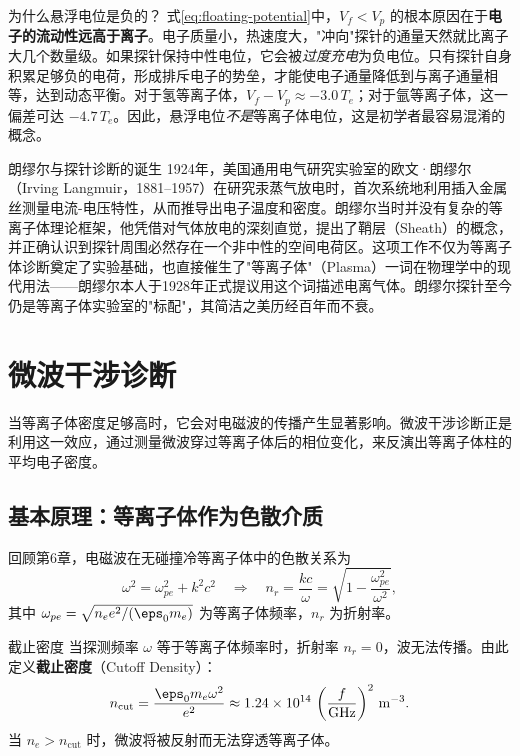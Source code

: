 \begin{insight}{为什么悬浮电位是负的？}{}{}
式\eqref{eq:floating-potential}中，$V_f < V_p$ 的根本原因在于\textbf{电子的流动性远高于离子}。电子质量小，热速度大，"冲向"探针的通量天然就比离子大几个数量级。如果探针保持中性电位，它会被\emph{过度充电}为负电位。只有探针自身积累足够负的电荷，形成排斥电子的势垒，才能使电子通量降低到与离子通量相等，达到动态平衡。对于氢等离子体，$V_f - V_p \approx -3.0\,T_e$；对于氩等离子体，这一偏差可达 $-4.7\,T_e$。因此，悬浮电位\emph{不是}等离子体电位，这是初学者最容易混淆的概念。
\end{insight}

\begin{history}{朗缪尔与探针诊断的诞生}{}{}
1924年，美国通用电气研究实验室的欧文·朗缪尔（Irving Langmuir，1881--1957）在研究汞蒸气放电时，首次系统地利用插入金属丝测量电流-电压特性，从而推导出电子温度和密度。朗缪尔当时并没有复杂的等离子体理论框架，他凭借对气体放电的深刻直觉，提出了鞘层（Sheath）的概念，并正确认识到探针周围必然存在一个非中性的空间电荷区。这项工作不仅为等离子体诊断奠定了实验基础，也直接催生了"等离子体"（Plasma）一词在物理学中的现代用法——朗缪尔本人于1928年正式提议用这个词描述电离气体。朗缪尔探针至今仍是等离子体实验室的"标配"，其简洁之美历经百年而不衰。
\end{history}


\section{微波干涉诊断}
\label{sec:12.3}

当等离子体密度足够高时，它会对电磁波的传播产生显著影响。微波干涉诊断正是利用这一效应，通过测量微波穿过等离子体后的相位变化，来反演出等离子体柱的平均电子密度。

\subsection{基本原理：等离子体作为色散介质}

回顾第6章，电磁波在无碰撞冷等离子体中的色散关系为
\begin{equation}
\omega^2 = \omega_{pe}^2 + k^2 c^2
\quad\Longrightarrow\quad
n_r = \frac{kc}{\omega} = \sqrt{1 - \frac{\omega_{pe}^2}{\omega^2}},
\label{eq:dispersion-cold}
\end{equation}
其中 $\omega_{pe} = \sqrt{n_e e^2 / (\eps_0 m_e)}$ 为等离子体频率，$n_r$ 为折射率。

\begin{definition}{截止密度}{}{}
当探测频率 $\omega$ 等于等离子体频率时，折射率 $n_r = 0$，波无法传播。由此定义\textbf{截止密度}（Cutoff Density）：
\begin{equation}
n_{\mathrm{cut}} = \frac{\eps_0 m_e \omega^2}{e^2}
\approx 1.24\times 10^{14}\,\left(\frac{f}{\mathrm{GHz}}\right)^2\,\mathrm{m}^{-3}.
\label{eq:cutoff-density}
\end{equation}
当 $n_e > n_{\mathrm{cut}}$ 时，微波将被反射而无法穿透等离子体。
\end{definition}

